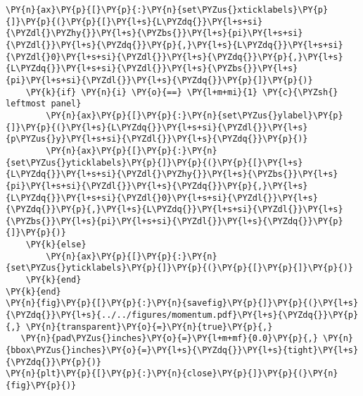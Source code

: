 \begin{Verbatim}[commandchars=\\\{\}]
    \PY{n}{ax}\PY{p}{[}\PY{p}{:}\PY{n}{set\PYZus{}xticklabels}\PY{p}{]}\PY{p}{(}\PY{p}{[}\PY{l+s}{L\PYZdq{}}\PY{l+s+si}{\PYZdl{}\PYZhy{}}\PY{l+s}{\PYZbs{}}\PY{l+s}{pi}\PY{l+s+si}{\PYZdl{}}\PY{l+s}{\PYZdq{}}\PY{p}{,}\PY{l+s}{L\PYZdq{}}\PY{l+s+si}{\PYZdl{}0}\PY{l+s+si}{\PYZdl{}}\PY{l+s}{\PYZdq{}}\PY{p}{,}\PY{l+s}{L\PYZdq{}}\PY{l+s+si}{\PYZdl{}}\PY{l+s}{\PYZbs{}}\PY{l+s}{pi}\PY{l+s+si}{\PYZdl{}}\PY{l+s}{\PYZdq{}}\PY{p}{]}\PY{p}{)}
    \PY{k}{if} \PY{n}{i} \PY{o}{==} \PY{l+m+mi}{1} \PY{c}{\PYZsh{} leftmost panel}
        \PY{n}{ax}\PY{p}{[}\PY{p}{:}\PY{n}{set\PYZus{}ylabel}\PY{p}{]}\PY{p}{(}\PY{l+s}{L\PYZdq{}}\PY{l+s+si}{\PYZdl{}}\PY{l+s}{p\PYZus{}y}\PY{l+s+si}{\PYZdl{}}\PY{l+s}{\PYZdq{}}\PY{p}{)}
        \PY{n}{ax}\PY{p}{[}\PY{p}{:}\PY{n}{set\PYZus{}yticklabels}\PY{p}{]}\PY{p}{(}\PY{p}{[}\PY{l+s}{L\PYZdq{}}\PY{l+s+si}{\PYZdl{}\PYZhy{}}\PY{l+s}{\PYZbs{}}\PY{l+s}{pi}\PY{l+s+si}{\PYZdl{}}\PY{l+s}{\PYZdq{}}\PY{p}{,}\PY{l+s}{L\PYZdq{}}\PY{l+s+si}{\PYZdl{}0}\PY{l+s+si}{\PYZdl{}}\PY{l+s}{\PYZdq{}}\PY{p}{,}\PY{l+s}{L\PYZdq{}}\PY{l+s+si}{\PYZdl{}}\PY{l+s}{\PYZbs{}}\PY{l+s}{pi}\PY{l+s+si}{\PYZdl{}}\PY{l+s}{\PYZdq{}}\PY{p}{]}\PY{p}{)}
    \PY{k}{else}
        \PY{n}{ax}\PY{p}{[}\PY{p}{:}\PY{n}{set\PYZus{}yticklabels}\PY{p}{]}\PY{p}{(}\PY{p}{[}\PY{p}{]}\PY{p}{)}
    \PY{k}{end}
\PY{k}{end}
\PY{n}{fig}\PY{p}{[}\PY{p}{:}\PY{n}{savefig}\PY{p}{]}\PY{p}{(}\PY{l+s}{\PYZdq{}}\PY{l+s}{../../figures/momentum.pdf}\PY{l+s}{\PYZdq{}}\PY{p}{,} \PY{n}{transparent}\PY{o}{=}\PY{n}{true}\PY{p}{,}
   \PY{n}{pad\PYZus{}inches}\PY{o}{=}\PY{l+m+mf}{0.0}\PY{p}{,} \PY{n}{bbox\PYZus{}inches}\PY{o}{=}\PY{l+s}{\PYZdq{}}\PY{l+s}{tight}\PY{l+s}{\PYZdq{}}\PY{p}{)}
\PY{n}{plt}\PY{p}{[}\PY{p}{:}\PY{n}{close}\PY{p}{]}\PY{p}{(}\PY{n}{fig}\PY{p}{)}
\end{Verbatim}


